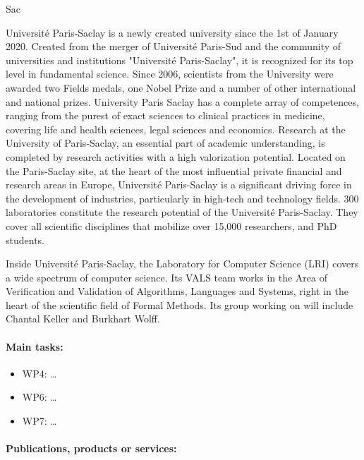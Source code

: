 \begin{sitedescription}{Sac}

Université Paris-Saclay is a newly created university since the 1st of
January 2020. Created from the merger of Université Paris-Sud and the
community of universities and institutions "Université Paris-Saclay", it
is recognized for its top level in fundamental science.  Since 2006,
scientists from the University were awarded two Fields medals, one Nobel
Prize and a number of other international and national prizes.
University Paris Saclay has a complete array of competences, ranging
from the purest of exact sciences to clinical practices in medicine,
covering life and health sciences, legal sciences and economics.
Research at the University of Paris-Saclay, an essential part of
academic understanding, is completed by research activities with a high
valorization potential. Located on the Paris-Saclay site, at the heart
of the most influential private financial and research areas in Europe,
Université Paris-Saclay is a significant driving force in the
development of industries, particularly in high-tech and technology
fields. 300 laboratories constitute the research potential of the
Université Paris-Saclay. They cover all scientific disciplines that
mobilize over 15,000 researchers, and PhD students.

Inside Université Paris-Saclay, the Laboratory for Computer Science
(LRI) covers a wide spectrum of computer science. Its VALS team works in
the Area of Verification and Validation of Algorithms, Languages and
Systems, right in the heart of the scientific field of Formal Methods.
Its group working on \pn will include Chantal Keller and Burkhart Wolff.

\paragraph{Main tasks:}

\begin{itemize}
\item WP4: \dots
\item WP6: \dots
\item WP7: \dots
\end{itemize}

\begin{compactitem}
\item{} 
\end{compactitem}

\paragraph{Publications, products or services:}


\end{sitedescription}

